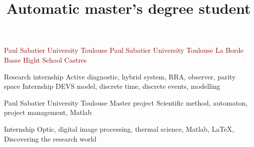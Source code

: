 \documentclass[11pt,a4paper,sans]{moderncv}        %
\title{\huge Automatic master's degree student} %
\begin{document}
\begin{samepage}
\makecvtitle
\vspace{-1cm}
\noindent\begin{minipage}[t]{.44\textwidth}
{\textcolor{darkred}{Paul Sabatier University}}%
{\textcolor{darkred}{Toulouse}}%
%
{\textcolor{darkred}{Paul Sabatier University}}%
{\textcolor{darkred}{Toulouse}}%
%
{\textcolor{darkred}{La Borde Basse Hight School}}%
{\textcolor{darkred}{Castres}}%
\end{minipage}\hfill%
\noindent\begin{minipage}[t]{.51\textwidth}
%
{Research internship}%
{Active diagnostic, hybrid system, RRA, observer, parity space}%
%
{Internship}%
{DEVS model, discrete time, discrete events, modelling}%


%
{Paul Sabatier University}%
{Toulouse}%
{Master project}%
{Scientific method, automaton, project management, Matlab}%

%
{Internship}%
{Optic, digital image processing, thermal science, Matlab, \LaTeX , Discovering the research world}%


\end{minipage}
\end{samepage}
\end{document}
